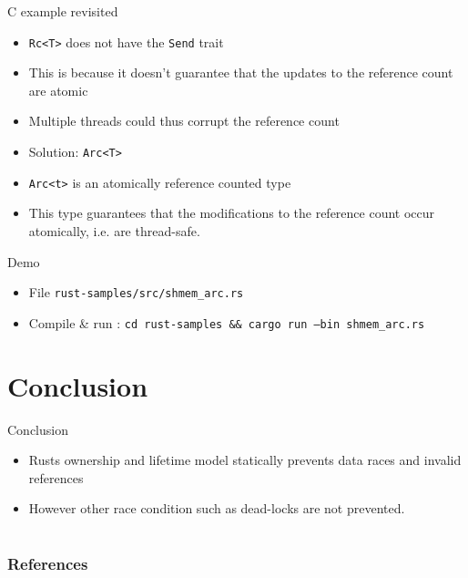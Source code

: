 \documentclass{beamer}
\begin{document}
\begin{frame}{C example revisited}
    \begin{itemize}
        \item \texttt{Rc<T>} does not have the \texttt{Send} trait
        \item This is because it doesn't guarantee that the updates to the reference count are atomic
        \item Multiple threads could thus corrupt the reference count
        \item Solution: \texttt{Arc<T>}
        \item \texttt{Arc<t>} is an atomically reference counted type
        \item This type guarantees that the modifications to the reference count occur atomically, i.e. are thread-safe.
    \end{itemize}
\end{frame}

\begin{frame}{Demo}
    \begin{itemize}
        \item File \texttt{rust-samples/src/shmem\_arc.rs}
        \item Compile \& run : \texttt{cd rust-samples \&\& cargo run --bin shmem\_arc.rs}
    \end{itemize}
\end{frame}

\section{Conclusion}
\begin{frame}{Conclusion}
    \begin{itemize}
        \item Rusts ownership and lifetime model statically prevents data races and invalid references
        \item However other race condition such as dead-locks are not prevented.
    \end{itemize}
\end{frame}

\section*{}
\begin{frame}[allowframebreaks]
    \frametitle{References}
    
    
\end{frame}
\end{document}
